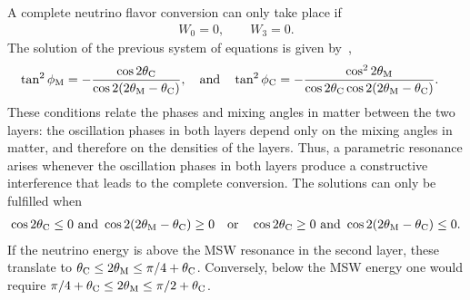 A complete neutrino flavor conversion can only take place if
\begin{align}
	W_0 = 0,\qquad W_3=0.
\end{align}  
The solution of the previous system of equations is given by~\cite{Chizhov:1998ug,Chizhov:1999az,Chizhov:1999he},
\begin{align}\label{eq:SolPR}
	\tan^2\phi_{\rm M}&=-\frac{\cos 2\theta_{\rm C}}{\cos 2(2\theta_{\rm M}-\theta_{\rm C})},\quad\text{and}\quad\tan^2\phi_{\rm C}=-\frac{\cos^2 2\theta_{\rm M}}{\cos 2\theta_{\rm C}\cos 2(2\theta_{\rm M}-\theta_{\rm C})}.
\end{align}
These conditions relate the phases and mixing angles in matter between the two layers: the oscillation phases in both layers depend only on the mixing angles in matter, and therefore on the densities of the layers. 
Thus, a parametric resonance arises whenever the oscillation phases in both layers produce a constructive interference that leads to the complete conversion.
The solutions can only be fulfilled when
\begin{align}\label{eq:ConPR}
	\cos 2\theta_{\rm C} \leq 0 \text{~and~} \cos 2(2\theta_{\rm M}-\theta_{\rm C}) \geq 0\quad\text{or}\quad
	\cos 2\theta_{\rm C} \geq 0 \text{~and~} \cos 2(2\theta_{\rm M}-\theta_{\rm C}) \leq 0.
\end{align}
If the neutrino energy is above the MSW resonance in the second layer, these translate to  $\theta_{\rm C}\leq 2\theta_{\rm M}\leq \pi/4+\theta_{\rm C}$.
Conversely, below the MSW energy one would require $\pi/4+\theta_{\rm C}\leq 2\theta_{\rm M}\leq \pi/2+\theta_{\rm C}$. 

